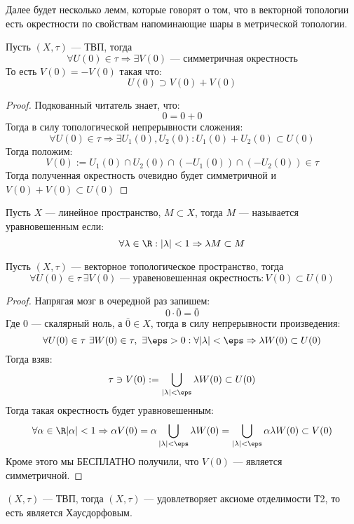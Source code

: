 Далее будет несколько лемм, которые говорят о том, что в векторной топологии есть окрестности по свойствам напоминающие шары в метрической топологии. 
\begin{lemma}
	\label{lem:sym1}
	Пусть $(X, \tau)$  --- ТВП, тогда 
	$$
	\forall U(0) \in \tau \Rightarrow \exists V(0)  \text{ --- симметричная окрестность}
	$$
	То есть $ V(0) = -V(0)$  такая что:
	$$
	U(0) \supset V(0) + V(0)
	$$
\end{lemma}
\begin{proof}
	Подкованный читатель знает, что: 
	$$
	0 = 0 + 0
	$$
	Тогда в силу топологической непрерывности сложения: 
	$$
	\forall U(0) \in \tau \Rightarrow \exists U_1(0), U_2(0):  U_1(0) + U_2(0) \subset U(0)
	$$
	Тогда положим: 
	$$
	V(0) := U_1(0) \cap U_2(0) \cap (-U_1(0)) \cap (-U_2(0)) \in \tau
	$$
	Тогда полученная окрестность очевидно будет симметричной и $V(0) + V(0) \subset U(0)$
\end{proof}
\begin{definition}
	Пусть $X$ --- линейное пространство, $M \subset X$, тогда $M$ --- называется уравновешенным если: 
	$$
	\forall \lambda \in \R: |\lambda| < 1 \Rightarrow \lambda M \subset M 
	$$
\end{definition}
\begin{lemma}
	\label{lem:tvs1}
	Пусть $(X, \tau)$ --- векторное топологическое пространство, тогда 
	$$
	\forall U(0) \in \tau \ \exists V(0) \text{ --- уравеновешенная окрестность}: V(0) \subset U(0)
	$$
\end{lemma}
\begin{proof}
	Напрягая мозг в очередной раз запишем:
	$$
	0 \cdot \bar{0} = \bar{0} 
	$$
	Где $0$ --- скалярный ноль, а $\bar{0} \in X$, тогда в силу непрерывности произведения: 
	$$
	\forall U(0) \in \tau \ \exists W(0) \in \tau, \ \exists \eps > 0: \forall |\lambda| < \eps \Rightarrow \lambda W(0) \subset U(0)
	$$
	Тогда взяв:
	$$
	\tau \ni V(0) : = \bigcup_{|\lambda| < \eps} \lambda W(0) \subset U(0)
	$$
	Тогда такая окрестность будет уравновешенным: 
	$$
	\forall \alpha \in \R |\alpha| < 1 \Rightarrow \alpha V(0) = \alpha \bigcup_{|\lambda| < \eps}\lambda W(0) = \bigcup_{|\lambda| < \eps}\alpha\lambda W(0) \subset V(0)
	$$
	Кроме этого мы БЕСПЛАТНО получили, что $V(0)$ --- является симметричной. 
\end{proof}
\begin{claim}
 $(X, \tau)$ --- ТВП, тогда $(X, \tau)$ --- удовлетворяет аксиоме отделимости Т2, то есть является Хаусдорфовым.
\end{claim}
